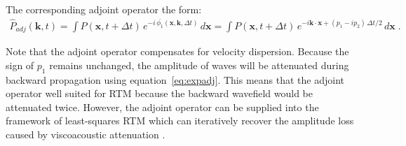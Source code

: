 The corresponding adjoint operator  the form:
\begin{eqnarray}
  \label{eq:expadj}
  \hat{P}_{adj}(\mathbf{k},t) = \int P(\mathbf{x},t+\Delta t)\,e^{-i\,\bar{\phi_1}(\mathbf{x},\mathbf{k},\Delta t)}\,d\mathbf{x}
  = \int P(\mathbf{x},t+\Delta t)\,e^{-i\mathbf{k} \cdot \mathbf{x} + (p_1 - ip_2)\,\Delta t/2}\,d\mathbf{x} \; .
\end{eqnarray}

Note that the adjoint operator compensates for velocity dispersion. Because the sign of $p_1$ remains unchanged, the amplitude of waves will be attenuated during backward propagation using equation~\ref{eq:expadj}. This means that the adjoint operator  well suited for RTM because the backward wavefield would be attenuated twice. However, the adjoint operator can be supplied into the framework of least-squares RTM which can iteratively recover the amplitude loss caused by viscoacoustic attenuation \cite[]{me14a}.

